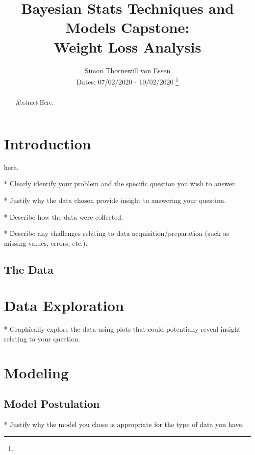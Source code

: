 \documentclass[journal, a4paper]{IEEEtran}
\begin{document}
	\title{Bayesian Stats Techniques and Models Capstone:\\ Weight Loss Analysis}
	\author{Simon Thornewill von Essen\\ Dates: 07/02/2020 - 10/02/2020
	\thanks{}}
	\markboth{}{}
	\maketitle


\begin{abstract}

Abstract Here.

\end{abstract}

\section{Introduction}
	 here.
	
* Clearly identify your problem and the specific question you wish to answer.

* Justify why the data chosen provide insight to answering your question.

* Describe how the data were collected.

* Describe any challenges relating to data acquisition/preparation (such as missing values, errors, etc.).
	
\subsection{The Data}

\section{Data Exploration}

* Graphically explore the data using plots that could potentially reveal insight relating to your question.

\section{Modeling}

\subsection{Model Postulation}

* Justify why the model you chose is appropriate for the type of data you have.
\end{document}
